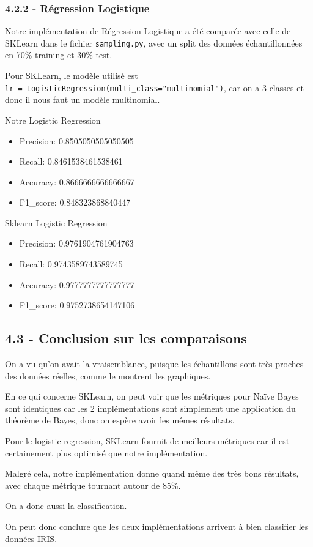 \documentclass[
]{article}
\begin{document}
\subsubsection{4.2.2 - Régression
Logistique}\label{ruxe9gression-logistique-2}

Notre implémentation de Régression Logistique a été comparée avec celle
de SKLearn dans le fichier \texttt{sampling.py}, avec un split des
données échantillonnées en 70\% training et 30\% test.

Pour SKLearn, le modèle utilisé est
\texttt{lr\ =\ LogisticRegression(multi\_class="multinomial")}, car on a
3 classes et donc il nous faut un modèle multinomial.
\cite{sklearnLogReg}

Notre Logistic Regression

\begin{itemize}
\item
  Precision: 0.8505050505050505
\item
  Recall: 0.8461538461538461
\item
  Accuracy: 0.8666666666666667
\item
  F1\_score: 0.848323868840447
\end{itemize}

Sklearn Logistic Regression

\begin{itemize}
\item
  Precision: 0.9761904761904763
\item
  Recall: 0.9743589743589745
\item
  Accuracy: 0.9777777777777777
\item
  F1\_score: 0.9752738654147106
\end{itemize}

\subsection{4.3 - Conclusion sur les
comparaisons}\label{conclusion-sur-les-comparaisons}

On a vu qu'on avait la vraisemblance, puisque les échantillons sont très
proches des données réelles, comme le montrent les graphiques.

En ce qui concerne SKLearn, on peut voir que les métriques pour Naïve
Bayes sont identiques car les 2 implémentations sont simplement une
application du théorème de Bayes, donc on espère avoir les mêmes
résultats.

Pour le logistic regression, SKLearn fournit de meilleurs métriques car
il est certainement plus optimisé que notre implémentation.

Malgré cela, notre implémentation donne quand même des très bons
résultats, avec chaque métrique tournant autour de 85\%.

On a donc aussi la classification.

On peut donc conclure que les deux implémentations arrivent à bien
classifier les données IRIS.

\newpage{}

\printbibliography[heading=bibintoc, title={Références}]
\end{document}
